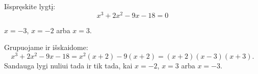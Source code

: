 \begin{salyga}
Išspręskite lygtį:
    \[ x^3 + 2x^2 - 9x - 18 = 0 \]
\end{salyga}

\begin{atsakymas}
$x=-3$, $x=-2$ arba $x=3$.
\end{atsakymas}

\begin{sprendimas}
Grupuojame ir išskaidome:
\[
x^3+2x^2-9x-18=x^2(x+2)-9(x+2)
=(x+2)(x-3)(x+3).
\]
Sandauga lygi nuliui tada ir tik tada, kai $x=-2$, $x=3$ arba $x=-3$.
\end{sprendimas}
